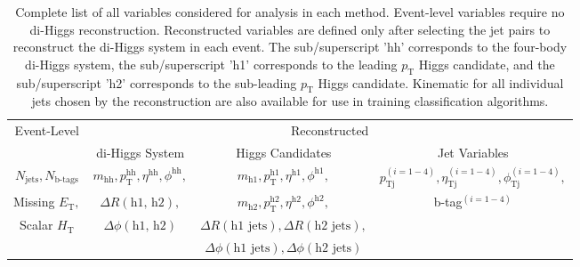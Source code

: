 \begin{table}[ht!]
 \label{tab:allVariables}
\centering
    \begin{tabular}{|c|c|c|c|} %
      \hline\hline
      \multirow{2}{*}{Event-Level} & \multicolumn{3}{c|}{Reconstructed}\\
      \cline{2-4}
      & di-Higgs System & Higgs Candidates & Jet Variables \\
      \hline
      $N_{\textrm{jets}}, N_{\textrm{b-tags}}$ & $m_{\textrm{hh}}, p_{\textrm{T}}^{\textrm{hh}}, \eta^{\textrm{hh}}, \phi^{\textrm{hh}},$ & $m_{\textrm{h1}}, p_{\textrm{T}}^{\textrm{h1}}, \eta^{\textrm{h1}}, \phi^{\textrm{h1}},$ & $p_{\textrm{Tj}}^{(i=1-4)}, \eta_{\textrm{Tj}}^{(i=1-4)}, \phi_{\textrm{Tj}}^{(i=1-4)},$ \\
      Missing $E_{\textrm{T}},$ & $\Delta R(\textrm{h1, h2}),$& $m_{\textrm{h2}}, p_{\textrm{T}}^{\textrm{h2}}, \eta^{\textrm{h2}}, \phi^{\textrm{h2}},$ & b-tag$^{(i=1-4)}$\\
      Scalar $H_{\textrm{T}}$ & $\Delta \phi(\textrm{h1, h2})$& $\Delta R(\textrm{h1 jets}), \Delta R(\textrm{h2 jets}),$& \\
      & & $\Delta \phi(\textrm{h1 jets}), \Delta \phi(\textrm{h2 jets})$ & \\
      \hline\hline
    \end{tabular}
\caption{Complete list of all variables considered for analysis in each method. Event-level variables require no di-Higgs reconstruction. Reconstructed variables are defined only after selecting the jet pairs to reconstruct the di-Higgs system in each event. The sub/superscript 'hh' corresponds to the four-body di-Higgs system, the sub/superscript 'h1' corresponds to the leading $p_{\textrm{T}}$ Higgs candidate, and the sub/superscript 'h2' corresponds to the sub-leading $p_{\textrm{T}}$ Higgs candidate. Kinematic for all individual jets chosen by the reconstruction are also available for use in training classification algorithms.}
\end{table}
